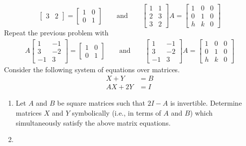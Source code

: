 \begin{tasks}[resume, style=enumerate]
\begin{displaymath}
\begin{bmatrix}
      3 & 2
    \end{bmatrix}
    =
    \begin{bmatrix}
      1 & 0 \\
      0 & 1
    \end{bmatrix}
    \qquad
    \text{and}
    \qquad
    \begin{bmatrix}
      1 & 1 \\
      2 & 3 \\
      3 & 2
    \end{bmatrix}
    A
    =
    \begin{bmatrix}
      1 & 0 & 0 \\
      0 & 1 & 0 \\
      h & k & 0
    \end{bmatrix}
  \end{displaymath}
\task
  Repeat the previous problem with
  \begin{align*}
    A
    \begin{bmatrix}
      1 & -1 \\
      3 & -2 \\
      -1 & 3
    \end{bmatrix}
    =
    \begin{bmatrix}
      1 & 0 \\
      0 & 1
    \end{bmatrix}
    \qquad
    \text{and}
    \qquad
    \begin{bmatrix}
      1 & -1 \\
      3 & -2 \\
      -1 & 3
    \end{bmatrix}
    A
    =
    \begin{bmatrix}
      1 & 0 & 0 \\
      0 & 1 & 0 \\
      h & k & 0
    \end{bmatrix}
  \end{align*}
\task
  Consider the following system of equations over matrices.
  \begin{align*}
    X + Y &= B \\
    AX + 2Y &= I
  \end{align*}
  \begin{enumerate}[label=(\alph*)]
  \item
    Let $A$ and $B$ be square matrices such that $2I - A$ is
    invertible.  Determine matrices $X$ and $Y$ symbolically (i.e., in
    terms of $A$ and $B$) which simultaneously satisfy the above
    matrix equations.
  \item

\end{enumerate}
\end{tasks}
